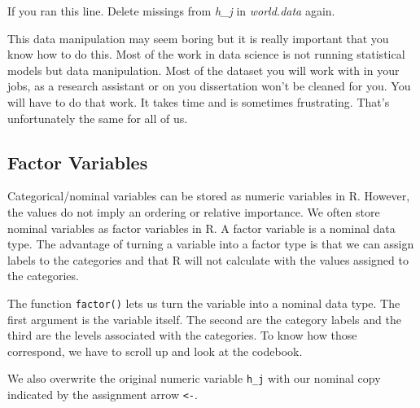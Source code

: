 \documentclass[]{book}
\newenvironment{Shaded}{\begin{snugshade}}{\end{snugshade}}
\newcommand{\KeywordTok}[1]{\textcolor[rgb]{0.13,0.29,0.53}{\textbf{#1}}}
\newcommand{\DataTypeTok}[1]{\textcolor[rgb]{0.13,0.29,0.53}{#1}}
\newcommand{\DecValTok}[1]{\textcolor[rgb]{0.00,0.00,0.81}{#1}}
\newcommand{\StringTok}[1]{\textcolor[rgb]{0.31,0.60,0.02}{#1}}
\newcommand{\CommentTok}[1]{\textcolor[rgb]{0.56,0.35,0.01}{\textit{#1}}}
\newcommand{\OperatorTok}[1]{\textcolor[rgb]{0.81,0.36,0.00}{\textbf{#1}}}
\newcommand{\NormalTok}[1]{#1}
\theoremstyle{definition}
\theoremstyle{definition}
\theoremstyle{definition}
\theoremstyle{remark}
\begin{document}
If you ran this line. Delete missings from \emph{h\_j} in
\emph{world.data} again.

This data manipulation may seem boring but it is really important that
you know how to do this. Most of the work in data science is not running
statistical models but data manipulation. Most of the dataset you will
work with in your jobs, as a research assistant or on you dissertation
won't be cleaned for you. You will have to do that work. It takes time
and is sometimes frustrating. That's unfortunately the same for all of
us.

\subsection{Factor Variables}\label{factor-variables}

Categorical/nominal variables can be stored as numeric variables in R.
However, the values do not imply an ordering or relative importance. We
often store nominal variables as factor variables in R. A factor
variable is a nominal data type. The advantage of turning a variable
into a factor type is that we can assign labels to the categories and
that R will not calculate with the values assigned to the categories.

The function \texttt{factor()} lets us turn the variable into a nominal
data type. The first argument is the variable itself. The second are the
category labels and the third are the levels associated with the
categories. To know how those correspond, we have to scroll up and look
at the codebook.

We also overwrite the original numeric variable \texttt{h\_j} with our
nominal copy indicated by the assignment arrow \texttt{\textless{}-}.

\begin{Shaded}
\end{Shaded}
\end{document}
